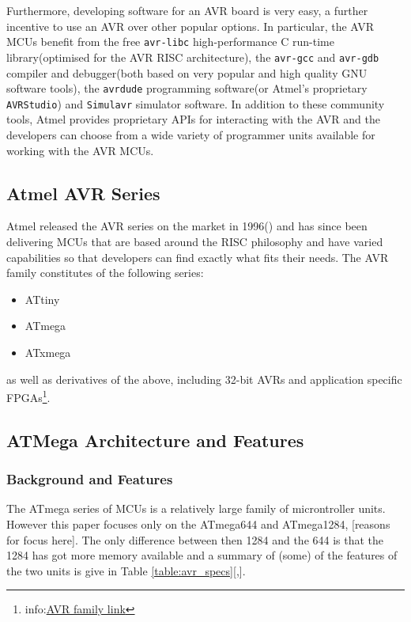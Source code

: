 \documentclass[12pt,a4paper,twocolumn]{article}
\begin{document}
	Furthermore, developing software for an AVR board is very easy, a further incentive to use an AVR over other popular options. In particular, the AVR MCUs benefit from the free \texttt{avr-libc} high-performance C run-time library(optimised for the AVR RISC architecture), the \texttt{avr-gcc} and \texttt{avr-gdb} compiler and debugger(both based on very popular and high quality GNU software tools), the \texttt{avrdude} programming software(or Atmel's proprietary \texttt{AVRStudio}) and \texttt{Simulavr} simulator software. In addition to these community tools, Atmel provides proprietary APIs for interacting with the AVR and the developers can choose from a wide variety of programmer units available for working with the AVR MCUs\cite{book:practical_avr}.
	
	\subsection{Atmel AVR Series}
	Atmel released the AVR series on the market in 1996(\cite{book:practical_avr}) and has since been delivering MCUs that are based around the RISC philosophy and have varied capabilities so that developers can find exactly what fits their needs. The AVR family constitutes of the following series:
	
	\begin{itemize}
		\item ATtiny \\
		\item ATmega \\
		\item ATxmega \\
	\end{itemize}
	
as well as derivatives of the above, including 32-bit AVRs and application specific FPGAs\footnote{info:\href{http://www.atmel.com/products/microcontrollers/avr/default.aspx}{AVR family link}}.

	\subsection{ATMega Architecture and Features}				

	\subsubsection{Background and Features}
	The ATmega series of MCUs is a relatively large family of microntroller units. However this paper focuses only on the ATmega644 and ATmega1284, [reasons for focus here]. The only difference between then 1284 and the 644 is that the 1284 has got more memory available and a summary of (some) of the features of the two units is give in Table \ref{table:avr_specs}[\citep{atmega644_manual},\citep{atmega1284_manual}]. 
	
\end{document}

